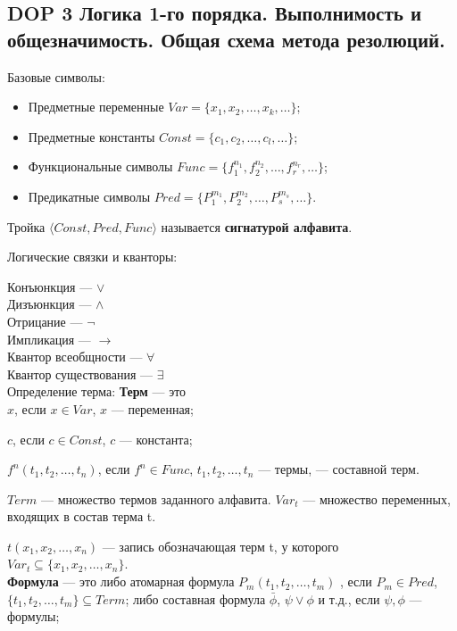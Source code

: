 \subsection{DOP 3 Логика 1-го порядка.  Выполнимость и общезначимость. Общая схема метода резолюций.}

Базовые символы: 
\begin{itemize}
    \item Предметные переменные $Var = \{x_1, x_2, \ldots, x_k, \ldots\}$;
    \item Предметные константы $Const = \{c_1, c_2,\ldots, c_l,\ldots\}$;
    \item Функциональные символы $Func = \{f^{n_1}_1,f^{n_2}_2,\ldots, f^{n_r}_r,\ldots\}$;
    \item Предикатные символы $Pred = \{P^{m_1}_1,P^{m_2}_2, \ldots, P^{m_s}_s,\ldots\}$.
\end{itemize}
Тройка $\langle Const,Pred,Func\rangle$ называется \textbf{сигнатурой алфавита}.

Логические связки и кванторы: 

Конъюнкция --- $\vee$ \\
Дизъюнкция --- $ \wedge $ \\
Отрицание --- $ \lnot $ \\
Импликация --- $ \longrightarrow $ \\
Квантор всеобщности --- $ \forall $ \\
Квантор существования --- $\exists$ \\


Определение терма: 
\textbf{Терм} --- это \\
$x$, если $x \in Var$, $x$ --- переменная;

$c$, если $c \in Const$, $c$ --- константа;

$f^n(t_1, t_2,\ldots, t_n)$,  если $f^n \in Func$, $t_1, t_2,\ldots, t_n$ --- термы, --- составной терм.

$Term$ --- множество термов заданного алфавита.
$Var_t$ --- множество переменных, входящих в состав терма t.

$t(x_1, x_2,\ldots, x_n)$ --- запись обозначающая терм t, у которого ${Var}_t \subseteq \{x_1, x_2,\ldots, x_n\}$.\\

\textbf{Формула} --- это либо атомарная формула
$P_m(t_1, t_2,\ldots, t_m)$ , если $ P_m \in Pred $, $\{t_1, t_2,\ldots, t_m\} \subseteq Term $; 
либо составная формула
$\bar{\phi}$, $\psi \vee \phi$ и т.д., если $\psi, \phi$ — формулы; 

